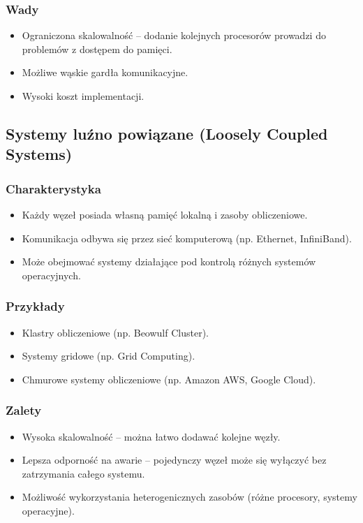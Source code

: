 \subsubsection{Wady}
\begin{itemize}
    \item Ograniczona skalowalność – dodanie kolejnych procesorów prowadzi do problemów z dostępem do pamięci.
    \item Możliwe wąskie gardła komunikacyjne.
    \item Wysoki koszt implementacji.
\end{itemize}

\subsection{Systemy luźno powiązane (Loosely Coupled Systems)}

\subsubsection{Charakterystyka}
\begin{itemize}
    \item Każdy węzeł posiada własną pamięć lokalną i zasoby obliczeniowe.
    \item Komunikacja odbywa się przez sieć komputerową (np. Ethernet, InfiniBand).
    \item Może obejmować systemy działające pod kontrolą różnych systemów operacyjnych.
\end{itemize}

\subsubsection{Przykłady}
\begin{itemize}
    \item Klastry obliczeniowe (np. Beowulf Cluster).
    \item Systemy gridowe (np. Grid Computing).
    \item Chmurowe systemy obliczeniowe (np. Amazon AWS, Google Cloud).
\end{itemize}

\subsubsection{Zalety}
\begin{itemize}
    \item Wysoka skalowalność – można łatwo dodawać kolejne węzły.
    \item Lepsza odporność na awarie – pojedynczy węzeł może się wyłączyć bez zatrzymania całego systemu.
    \item Możliwość wykorzystania heterogenicznych zasobów (różne procesory, systemy operacyjne).
\end{itemize}

